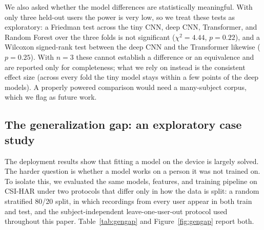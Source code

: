 \documentclass{ieeeaccess}
\begin{document}
\begin{table}[t]
\caption{Per-held-out-user leave-one-user-out accuracy (\%) on CSI-HAR, neural models averaged over three seeds (mean $\pm$ std). These values are from the dedicated multi-seed metrics run; averaging the three folds gives a leave-one-user-out mean that differs by one to two points from the frontier-run entry in Table~\ref{tab:frontier} (a different seed set), both within the fold-to-fold variance. With only three users the per-user spread and the seed sensitivity, especially on user 3, are more informative than a single pooled accuracy or a significance test.}
\label{tab:peruser}
\centering
\footnotesize
\setlength{\tabcolsep}{4pt}
\end{table}

We also asked whether the model differences are statistically meaningful. With only three held-out users the power is very low, so we treat these tests as exploratory: a Friedman test across the tiny CNN, deep CNN, Transformer, and Random Forest over the three folds is not significant ($\chi^2 = 4.44$, $p = 0.22$), and a Wilcoxon signed-rank test between the deep CNN and the Transformer likewise ($p = 0.25$). With $n=3$ these cannot establish a difference or an equivalence and are reported only for completeness; what we rely on instead is the consistent effect size (across every fold the tiny model stays within a few points of the deep models). A properly powered comparison would need a many-subject corpus, which we flag as future work.

\subsection{The generalization gap: an exploratory case study}
\label{sec:results-gap}
The deployment results show that fitting a model on the device is largely solved. The harder question is whether a model works on a person it was not trained on. To isolate this, we evaluated the same models, features, and training pipeline on CSI-HAR under two protocols that differ only in how the data is split: a random stratified 80/20 split, in which recordings from every user appear in both train and test, and the subject-independent leave-one-user-out protocol used throughout this paper. Table~\ref{tab:gengap} and Figure~\ref{fig:gengap} report both.
\end{document}
